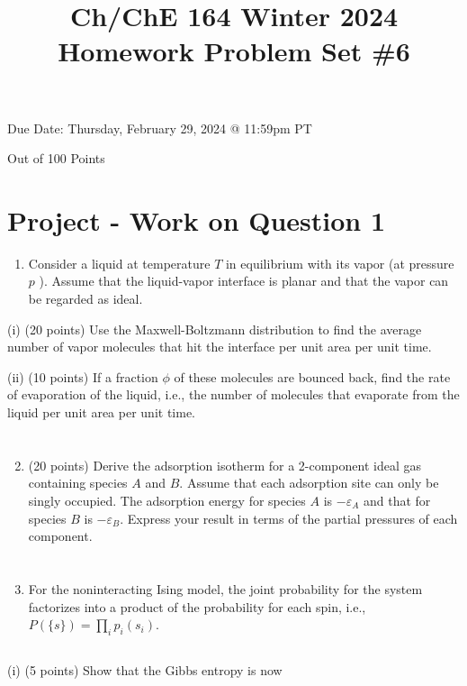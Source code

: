 \documentclass[12pt]{article}
\title{Ch/ChE 164 Winter 2024 
 Homework Problem Set \#6 }
\author{}
\date{}
\begin{document}
\maketitle
Due Date: Thursday, February 29, 2024 @ 11:59pm PT

Out of 100 Points
\section{}
\section*{Project - Work on Question 1}
\begin{enumerate}
  \item Consider a liquid at temperature $T$ in equilibrium with its vapor (at pressure $p$ ). Assume that the liquid-vapor interface is planar and that the vapor can be regarded as ideal.
\end{enumerate}

(i) (20 points) Use the Maxwell-Boltzmann distribution to find the average number of vapor molecules that hit the interface per unit area per unit time.

(ii) (10 points) If a fraction $\phi$ of these molecules are bounced back, find the rate of evaporation of the liquid, i.e., the number of molecules that evaporate from the liquid per unit area per unit time.
\section{}
\begin{enumerate}
  \setcounter{enumi}{1}
  \item (20 points) Derive the adsorption isotherm for a 2-component ideal gas containing species $A$ and $B$. Assume that each adsorption site can only be singly occupied. The adsorption energy for species $A$ is $-\varepsilon_{A}$ and that for species $B$ is $-\varepsilon_{B}$. Express your result in terms of the partial pressures of each component.
\section{}
  \item For the noninteracting Ising model, the joint probability for the system factorizes into a product of the probability for each spin, i.e., $P(\{s\})=\prod_{i} p_{i}\left(s_{i}\right)$.

\end{enumerate}
\subsection{}
(i) (5 points) Show that the Gibbs entropy is now
\end{document}

